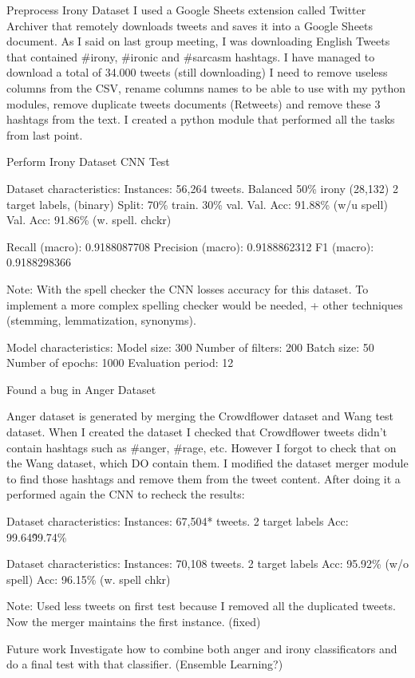 Preprocess Irony Dataset
I used a Google Sheets extension called Twitter Archiver that remotely downloads tweets and saves it into a Google Sheets document.
As I said on last group meeting, I was downloading English Tweets that contained \#irony, \#ironic and \#sarcasm hashtags.
I have managed to download a total of 34.000 tweets (still downloading)
I need to remove useless columns from the CSV, rename columns names to be able to use with my python modules, remove duplicate tweets documents (Retweets) and remove these 3 hashtags from the text.
I created a python module that performed all the tasks from last point.

Perform Irony Dataset CNN Test

Dataset characteristics:
Instances: 56,264 tweets.
Balanced 50\% irony (28,132)
2 target labels, (binary)
Split: 70\% train. 30\% val.
Val. Acc: 91.88\% (w/u spell)
Val. Acc: 91.86\% (w. spell. chckr)

Recall (macro): 0.9188087708
Precision (macro): 0.9188862312
F1 (macro): 0.9188298366

Note: With the spell checker the CNN losses accuracy for this dataset. To implement a more complex spelling checker would be needed, + other techniques (stemming, lemmatization, synonyms).

Model characteristics:
Model size: 300
Number of filters: 200
Batch size: 50
Number of epochs: 1000
Evaluation period: 12

Found a bug in Anger Dataset

Anger dataset is generated by merging the Crowdflower dataset and Wang test dataset.
When I created the dataset I checked that Crowdflower tweets didn’t contain hashtags such as \#anger, \#rage, etc. However I forgot to check that on the Wang dataset, which  DO contain them. I modified the dataset merger module to find those hashtags and remove them from the tweet content. After doing it a performed again the CNN to recheck the results:

Dataset characteristics:
Instances: 67,504* tweets.
2 target labels
Acc: 99.64\~99.74\%

Dataset characteristics:
Instances: 70,108 tweets.
2 target labels
Acc: 95.92\% (w/o spell)
Acc: 96.15\% (w. spell chkr)

Note: Used less tweets on first test because I removed all the duplicated tweets. Now the merger maintains the first instance. (fixed)

Future work
Investigate how to combine both anger and irony classificators and do a final test with that classifier. (Ensemble Learning?)

